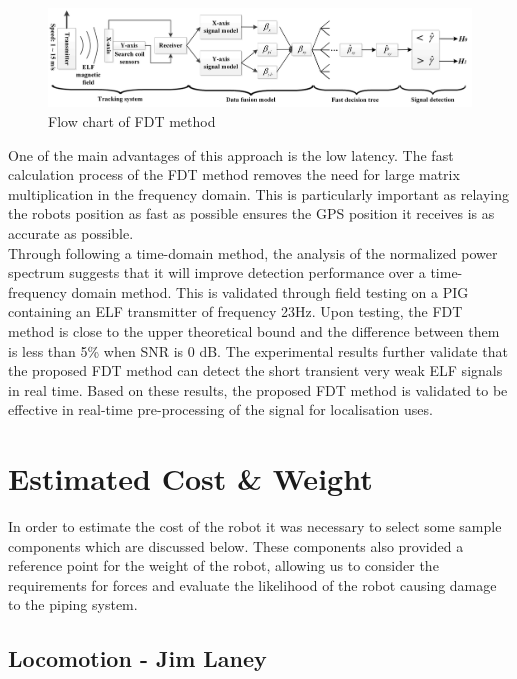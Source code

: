 \documentclass[11pt]{article}		%
\begin{document}
         \begin{figure}[h]
			\centering
			\includegraphics[scale=0.12]{FDT.png}
			\caption{Flow chart of FDT method }
			\label{FDTFlowcahrt}
		\end{figure}
		
		One of the main advantages of this approach is the low latency. 
		The fast calculation process of the FDT method removes the need for large matrix multiplication in the frequency domain. 
		This is particularly important as relaying the robots position as fast as possible ensures the GPS position it receives is as accurate as possible. 
		\\
    	\hspace*{3ex}Through following a time-domain method, the analysis of the normalized power spectrum suggests that it will improve detection performance over a time-frequency domain method. 
    	This is validated through field testing on a PIG containing an ELF transmitter of frequency 23Hz. 
    	Upon testing, the FDT method is close to the upper theoretical bound and the difference between them is less than 5\%  when SNR is 0 dB.
    	The experimental results further validate that the proposed FDT method can detect the short transient very weak ELF signals in real time. 
    	Based on these results, the proposed FDT method is validated to be effective in real-time pre-processing of the signal for localisation uses.
		
	\section{Estimated Cost \& Weight}
		
		In order to estimate the cost of the robot it was necessary to select some sample components which are discussed below.
		These components also provided a reference point for the weight of the robot, allowing us to consider the requirements for forces and evaluate the likelihood of the robot causing damage to the piping system.
		
		\subsection[Locomotion]{Locomotion - Jim Laney}
		
\end{document}
